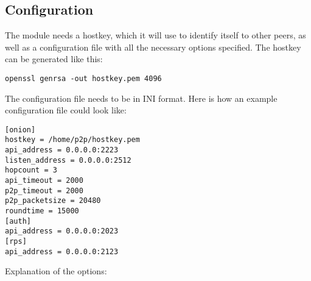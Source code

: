 \documentclass{article}
\begin{document}
\subsection{Configuration}
The module needs a hostkey, which it will use to identify itself to other peers, as well as a configuration file with all the necessary options specified. The hostkey can be generated like this:
\begin{lstlisting}
openssl genrsa -out hostkey.pem 4096
\end{lstlisting} 
The configuration file needs to be in INI format. Here is how an example configuration file could look like:
\begin{lstlisting}
[onion]
hostkey = /home/p2p/hostkey.pem
api_address = 0.0.0.0:2223
listen_address = 0.0.0.0:2512
hopcount = 3
api_timeout = 2000
p2p_timeout = 2000
p2p_packetsize = 20480
roundtime = 15000
[auth]
api_address = 0.0.0.0:2023
[rps]
api_address = 0.0.0.0:2123
\end{lstlisting}
Explanation of the options:
\end{document}
